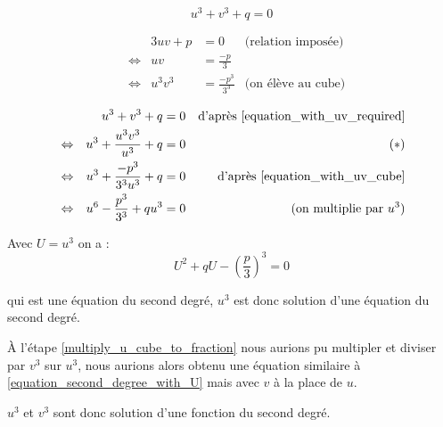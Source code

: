 \documentclass[]{../templates/homework}
\begin{document}
\begin{equation*}
	u^3 + v^3 + q = 0 \tag{$E_3$} \label{equation_with_uv_required}
\end{equation*}

\question

\begin{align*}
	&& 3uv + p &= 0 &\text{(relation imposée)}\\
	&\Leftrightarrow &uv &= \frac{-p}{3} & \\
	&\Leftrightarrow &u^3v^3 &= \frac{-p^3}{3^3} &\text{(on élève au cube)} \tag{$E_4$} \label{equation_with_uv_cube}
\end{align*}

\question

\begin{align*}
	&& u^3 + v^3 + q &= 0 &\text{d'après \eqref{equation_with_uv_required}} \\
	&\Leftrightarrow &u^3 + \frac{u^3v^3}{u^3} + q &= 0 & \tag{$\ast$} \label{multiply_u_cube_to_fraction}\\
	&\Leftrightarrow &u^3 + \frac{-p^3}{3^3u^3} + q &= 0 &\text{d'après \eqref{equation_with_uv_cube}} \\
	&\Leftrightarrow &u^6 - \frac{p^3}{3^3} + qu^3 &= 0 &\text{(on multiplie par $u^3$)}
\end{align*}

Avec $U = u^3$ on a :
\begin{equation}
	\tag{$E_5$}
	U^2 + qU - \left(\frac{p}{3}\right)^3 = 0
	\label{equation_second_degree_with_U}
\end{equation}

qui est une équation du second degré, $u^3$ est donc solution d'une équation du second degré.

À l'étape \eqref{multiply_u_cube_to_fraction} nous aurions pu multipler et diviser par $v^3$ sur $u^3$, nous aurions alors obtenu une équation similaire à \eqref{equation_second_degree_with_U} mais avec $v$ à la place de $u$.

$u^3$ et $v^3$ sont donc solution d'une fonction du second degré.
\end{document}
